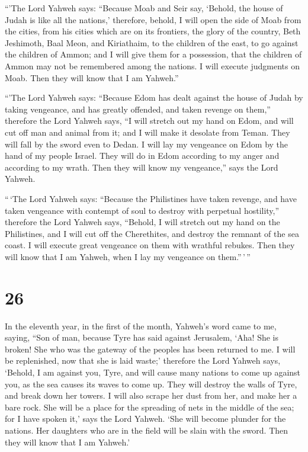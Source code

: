  ``'The Lord Yahweh says: ``Because Moab and Seir say,
`Behold, the house of Judah is like all the nations,' 
therefore, behold, I will open the side of Moab from the cities, from
his cities which are on its frontiers, the glory of the country, Beth
Jeshimoth, Baal Meon, and Kiriathaim,  to the children of
the east, to go against the children of Ammon; and I will give them for
a possession, that the children of Ammon may not be remembered among the
nations.  I will execute judgments on Moab. Then they
will know that I am Yahweh.''

 ``'The Lord Yahweh says: ``Because Edom has dealt
against the house of Judah by taking vengeance, and has greatly
offended, and taken revenge on them,''  therefore the
Lord Yahweh says, ``I will stretch out my hand on Edom, and will cut off
man and animal from it; and I will make it desolate from Teman. They
will fall by the sword even to Dedan.  I will lay my
vengeance on Edom by the hand of my people Israel. They will do in Edom
according to my anger and according to my wrath. Then they will know my
vengeance,'' says the Lord Yahweh.

 ``\,`The Lord Yahweh says: ``Because the Philistines
have taken revenge, and have taken vengeance with contempt of soul to
destroy with perpetual hostility,''  therefore the Lord
Yahweh says, ``Behold, I will stretch out my hand on the Philistines,
and I will cut off the Cherethites, and destroy the remnant of the sea
coast.  I will execute great vengeance on them with
wrathful rebukes. Then they will know that I am Yahweh, when I lay my
vengeance on them.''\,'\,''

\hypertarget{section-24}{%
\section{26}\label{section-24}}

 In the eleventh year, in the first of the month, Yahweh's
word came to me, saying,  ``Son of man, because Tyre has
said against Jerusalem, `Aha! She is broken! She who was the gateway of
the peoples has been returned to me. I will be replenished, now that she
is laid waste;'  therefore the Lord Yahweh says, `Behold,
I am against you, Tyre, and will cause many nations to come up against
you, as the sea causes its waves to come up.  They will
destroy the walls of Tyre, and break down her towers. I will also scrape
her dust from her, and make her a bare rock.  She will be
a place for the spreading of nets in the middle of the sea; for I have
spoken it,' says the Lord Yahweh. `She will become plunder for the
nations.  Her daughters who are in the field will be slain
with the sword. Then they will know that I am Yahweh.'

